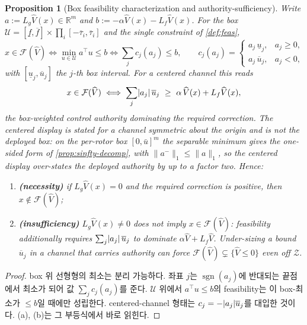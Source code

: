 \documentclass[11pt]{article}
\theoremstyle{plain}
\newtheorem{proposition}[theorem]{Proposition}
\theoremstyle{definition}
\theoremstyle{remark}
\newcommand{\R}{\mathbb{R}}
\DeclarePairedDelimiter{\abs}{\lvert}{\rvert}
\newcommand{\calU}{\mathcal{U}}
\newcommand{\Vhat}{\widehat V}
\newcommand{\Lg}{L_g}
\newcommand{\Lf}{L_f}
\newcommand{\sgn}{\operatorname{sgn}}
\newcommand{\bignormone}[1]{\lVert#1\rVert_1}
\newcommand{\eqdef}{:=}
\begin{document}
\begin{proposition}[Box feasibility characterization and authority-sufficiency]\label{prop:box-feas}
Write $a\eqdef\Lg\Vhat(x)\in\R^m$ and $b\eqdef-\alpha\Vhat(x)-\Lf\Vhat(x)$. For the box
$\calU=[\underline f,\overline f]\times\prod_i[-\overline\tau_i,\overline\tau_i]$ and the single
constraint of \cref{def:feas},
\begin{equation}
x\in\mathcal F(\Vhat)\iff \min_{u\in\calU}a^\top u\le b\iff \sum_{j}c_j(a_j)\le b,\qquad
c_j(a_j)=\begin{cases}a_j\,\underline u_j,&a_j\ge0,\\ a_j\,\overline u_j,&a_j<0,\end{cases}
\end{equation}
with $[\underline u_j,\overline u_j]$ the $j$-th box interval. For a centered channel this reads
\begin{equation}
x\in\mathcal F(\Vhat)\iff \sum_j\abs{a_j}\,\overline u_j\ \ge\ \alpha\,\Vhat(x)+\Lf\Vhat(x),
\end{equation}
the \emph{box-weighted control authority} dominating the \emph{required correction}. The centered
display is stated for a channel symmetric about the origin and is \emph{not} the deployed box: on
the per-rotor box $[0,\bar u]^m$ the separable minimum gives the one-sided form of
\cref{prop:sinfty-decomp}, with $\bignormone{a^-}\le\bignormone{a}$, so the centered display
over-states the deployed authority by up to a factor two. Hence:
\begin{enumerate}[label=(\alph*)]
  \item \textbf{(necessity)} if $\Lg\Vhat(x)=0$ and the required correction is positive, then $x\notin\mathcal F(\Vhat)$;
  \item \textbf{(insufficiency)} $\Lg\Vhat(x)\neq0$ does \emph{not} imply $x\in\mathcal F(\Vhat)$: feasibility additionally requires $\sum_j\abs{a_j}\,\overline u_j$ to dominate $\alpha\Vhat+\Lf\Vhat$. Under-sizing a bound $\overline u_j$ in a channel that carries authority can force $\mathcal F(\Vhat)\subsetneq\{\Vhat\le0\}$ even off $\mathcal Z$.
\end{enumerate}
\end{proposition}
\begin{proof}
box 위 선형형의 최소는 분리 가능하다. 좌표 $j$는 $\sgn(a_j)$에 반대되는 끝점에서 최소가 되어 값
$\sum_j c_j(a_j)$를 준다. $\calU$ 위에서 $a^\top u\le b$의 feasibility는 이 box-최소가 $\le b$일
때에만 성립한다. centered-channel 형태는 $c_j=-\abs{a_j}\overline u_j$를 대입한 것이다. (a), (b)는
그 부등식에서 바로 읽힌다.
\end{proof}
\end{document}
